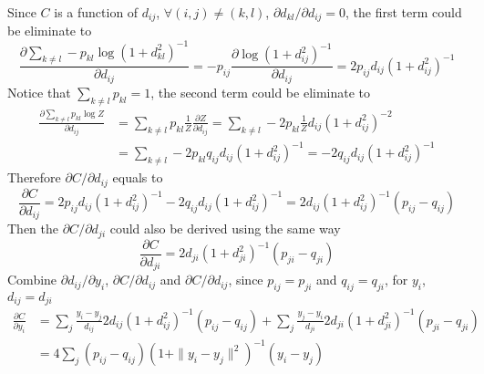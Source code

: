 \documentclass[11pt]{article}
\begin{document}
Since $C$ is a function of $d_{ij}$, $\forall (i, j)\neq (k, l)$, $\partial d_{kl}/\partial d_{ij}=0$, the first term could be eliminate to 
$$
\frac{\partial \sum_{k\neq l}-p_{kl}\log(1+d_{kl}^2)^{-1}}{\partial d_{ij}} = -p_{ij}\frac{\partial\log (1+d_{ij}^2)^{-1}}{\partial d_{ij}} = 
2p_{ij}d_{ij}(1+d_{ij}^2)^{-1}
$$
Notice that $\sum_{k\neq l}p_{kl}=1$, the second term could be eliminate to
$$
\begin{aligned}
    \frac{\partial \sum_{k\neq l} p_{kl}\log Z}{\partial d_{ij}} &= \sum_{k\neq l}p_{kl}\frac{1}{Z}\frac{\partial Z}{\partial d_{ij}}
    = \sum_{k\neq l}-2p_{kl}\frac{1}{Z}d_{ij}(1+d_{ij}^2)^{-2}\\ &= \sum_{k\neq l} -2p_{kl}q_{ij}d_{ij}(1+d_{ij}^2)^{-1} = -2q_{ij}d_{ij}(1+d_{ij}^2)^{-1}
\end{aligned}
$$
Therefore $\partial C/\partial d_{ij}$ equals to 
$$
\frac{\partial C}{\partial d_{ij}} = 2p_{ij}d_{ij}(1+d_{ij}^2)^{-1} - 2q_{ij}d_{ij}(1+d_{ij}^2)^{-1} = 
2d_{ij}(1+d_{ij}^2)^{-1}(p_{ij}-q_{ij})
$$
Then the $\partial C/\partial d_{ji}$ could also be derived using the same way
$$
\frac{\partial C}{\partial d_{ji}} = 2d_{ji}(1+d_{ji}^2)^{-1}(p_{ji}-q_{ji})
$$
Combine $\partial{d_{ij}}/\partial{y_i}$, $\partial C/\partial d_{ij}$ and $\partial C/\partial d_{ij}$, since $p_{ij}=p_{ji}$ and 
$q_{ij}=q_{ji}$, for $y_i$, $d_{ij}=d_{ji}$
$$
\begin{aligned}
    \frac{\partial C}{\partial y_i} &= \sum_j \frac{y_i-y_j}{d_{ij}}2d_{ij}(1+d_{ij}^2)^{-1}(p_{ij}-q_{ij}) + 
    \sum_j \frac{y_j-y_i}{d_{ji}}2d_{ji}(1+d_{ji}^2)^{-1}(p_{ji}-q_{ji})\\
    & = 
    4\sum_j (p_{ij}-q_{ij})(1+\|y_i-y_j\|^2)^{-1}(y_i-y_j)
\end{aligned}
$$
\end{document}
